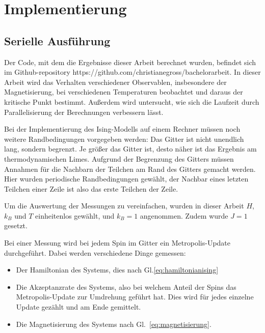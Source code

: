 	\chapter{Implementierung}
	\label{chap:implementierung}
	
	\section{Serielle Ausführung}
	\label{sec:seriellimplementierung}
	
	Der Code, mit dem die Ergebnisse dieser Arbeit berechnet wurden, befindet sich im Github-repository https://github.com/christianegross/bachelorarbeit. In dieser Arbeit wird das Verhalten verschiedener Observablen, insbesondere der Magnetisierung, bei verschiedenen Temperaturen beobachtet und daraus der kritische Punkt bestimmt. Außerdem wird untersucht, wie sich die Laufzeit durch Parallelisierung der Berechnungen verbessern lässt.%
	
	Bei der Implementierung des Ising-Modells auf einem Rechner müssen noch weitere Randbedingungen vorgegeben werden:
	Das Gitter ist nicht unendlich lang, sondern begrenzt. Je größer das Gitter ist, desto näher ist das Ergebnis am thermodynamischen Limes. 
	Aufgrund der Begrenzung des Gitters müssen Annahmen für die Nachbarn der Teilchen am Rand des Gitters gemacht werden. Hier wurden periodische Randbedingungen gewählt, der Nachbar eines letzten Teilchen einer Zeile ist also das erste Teilchen der Zeile.
	
	Um die Auswertung der Messungen zu vereinfachen, wurden in dieser Arbeit $H$, $k_B$ und $T$ einheitenlos gewählt, und $k_B=1$ angenommen. Zudem wurde $J=1$ gesetzt.
	
	Bei einer Messung wird bei jedem Spin im Gitter ein Metropolis-Update durchgeführt. %
	Dabei werden verschiedene Dinge gemessen: \begin{itemize}
		\item Der Hamiltonian des Systems, dies nach Gl.\ref{eq:hamiltonianising}
		\item Die Akzeptanzrate des Systems, also bei welchem Anteil der Spins das Metropolis-Update zur Umdrehung geführt hat. Dies wird für jedes einzelne Update gezählt und am Ende gemittelt.
		\item Die Magnetisierung des Systems nach Gl.~\ref{eq:magnetisierung}. 
	\end{itemize}
	

